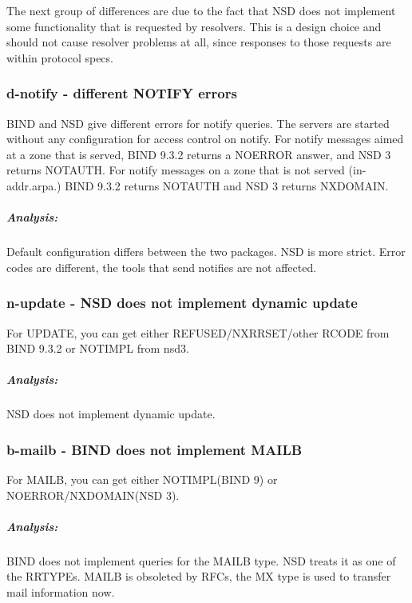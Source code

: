\documentclass[twoside,titlepage,english]{nlnetlabs}
\begin{document}
The next group of differences are due to the fact that NSD does not
implement some functionality that is requested by resolvers.  This 
is a design choice and should not cause resolver problems at all,
since responses to those requests are within protocol specs.


\subsubsection{d-notify - different NOTIFY errors}
\label{d-notify}

BIND and NSD give different errors for notify queries. The servers are started 
without any configuration for access control on notify. For notify messages 
aimed at a zone that is served, BIND 9.3.2 returns a NOERROR answer, and 
NSD 3 returns NOTAUTH. For notify messages on a zone that is not served 
(in-addr.arpa.) BIND 9.3.2 returns NOTAUTH and NSD 3 returns NXDOMAIN.

\vspace{-8pt}\subparagraph{Analysis:}

Default configuration differs between the two packages. NSD is more strict.
Error codes are different, the tools that send notifies are not affected.


\subsubsection{n-update - NSD does not implement dynamic update}
\label{n-update}

For UPDATE, you can get either REFUSED/NXRRSET/other RCODE from BIND 9.3.2 or 
NOTIMPL from nsd3.

\vspace{-8pt}\subparagraph{Analysis:}

NSD does not implement dynamic update. 


\subsubsection{b-mailb - BIND does not implement MAILB}
\label{b-mailb}

For MAILB, you can get either NOTIMPL(BIND 9) or NOERROR/NXDOMAIN(NSD 3).

\vspace{-8pt}\subparagraph{Analysis:}

BIND does not implement queries for the MAILB type. NSD treats it as 
one of the RRTYPEs. MAILB is obsoleted by RFCs, the MX type is 
used to transfer mail information now.
\end{document}
